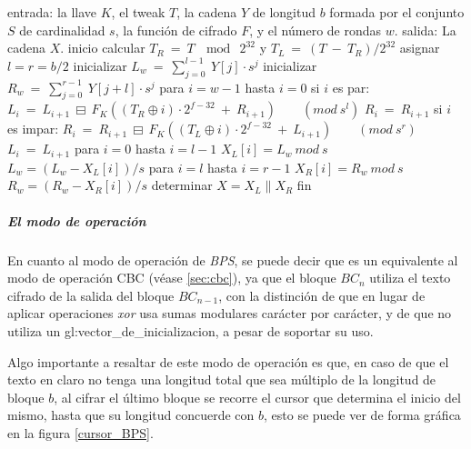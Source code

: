 \begin{pseudocodigo}[caption={Proceso de descifrado $BC^{-1}$.}, 
label={descifrado_BC}]
  entrada:    la llave $K$, el tweak $T$, la cadena $Y$ de longitud $b$ formada por el conjunto $S$ 
              de cardinalidad $s$, la función de cifrado $F$, y el número de rondas $w$. 
  salida:     La cadena $X$.
  inicio
    calcular $T_R\: =\: T\: \mod\: 2^{32}$ y $T_L\: =\: (T\: -\: T_R) / 2^{32}$
    asignar $l = r = b/2$
    inicializar $L_w\: =\: \sum_{j=0}^{l-1}\: Y[j] \cdot s^j$
    inicializar $R_w\: =\: \sum_{j=0}^{r-1}\: Y[j+l] \cdot s^j$
    para $i=w-1$ hasta $i=0$
    si $i$ es par:
      $L_i\: =\: L_{i+1}\: \boxminus\: F_K((T_R \oplus i) \cdot 2^{f-32}\: +\: R_{i+1})\qquad (mod\ s^l)$
      $R_i\: =\: R_{i+1}$
    si $i$ es impar:
      $R_i\: =\: R_{i+1}\: \boxminus\: F_K((T_L \oplus i) \cdot 2^{f-32}\: +\: L_{i+1})\qquad (mod\ s^r)$
      $L_i\: =\: L_{i+1}$
    para $i=0$ hasta $i=l-1$
      $X_L[i] = L_w\ mod\ s$
      $L_w = (L_w - X_L[i])/s$
    para $i=l$ hasta $i=r-1$
      $X_R[i] = R_w\ mod\ s$
      $R_w = (R_w - X_R[i])/s$
    determinar $X = X_L \parallel X_R$
  fin
\end{pseudocodigo}


\subparagraph{El modo de operación}

En cuanto al modo de operación de \textit{BPS}, se puede decir que es un 
equivalente al modo de operación CBC (véase \ref{sec:cbc}), ya que el bloque 
$BC_n$ utiliza el texto cifrado de la salida del bloque $BC_{n-1}$, con la 
distinción de que en lugar de aplicar operaciones \textit{xor} usa sumas 
modulares carácter por carácter, y de que no utiliza un 
\gls{gl:vector_de_inicializacion}, a pesar de soportar su uso.

Algo importante a resaltar de este modo de operación es que, en caso de que el 
texto en claro no tenga una longitud total que sea múltiplo de la longitud de 
bloque $b$, al cifrar el último bloque se recorre el cursor que determina 
el inicio del mismo, hasta que su longitud concuerde con $b$, esto se puede 
ver de forma gráfica en la figura \ref{cursor_BPS}.

